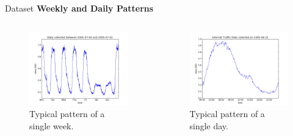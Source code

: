 \documentclass{beamer}
\begin{document}
  \begin{frame}{Dataset}   
    \textbf{Weekly and Daily Patterns}
    \begin{columns}[c]
      \begin{figure}
       \includegraphics[width=1.05\textwidth]{images/traffic_over_week.png}
       \caption{Typical pattern of a single week.}
      \end{figure}

        \begin{figure}
         \includegraphics[width=1.05\textwidth]{images/traffic_over_day.png}
         \caption{Typical pattern of a single day.}
        \end{figure}
    \end{columns}
  \end{frame}  
  
\end{document}
